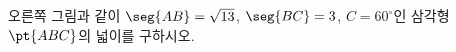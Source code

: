 \noindent\begin{minipage}[t]{0.58\linewidth}\vspace{0pt}\raggedright 오른쪽 그림과 같이 $\seg{AB}=\sqrt{13}$, $\seg{BC}=3$, $C=60^\circ$인 삼각형~$\pt{ABC}$의 넓이를 구하시오.\end{minipage}\hfill\begin{minipage}[t]{0.4\linewidth}\vspace{0pt}\centering \resizebox{\ifdim\width>\linewidth\linewidth\else\width\fi}{!}{}\end{minipage}\par
